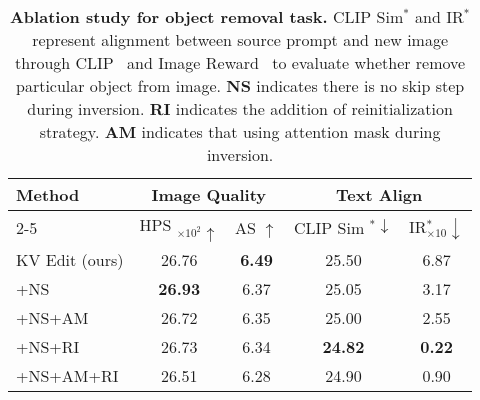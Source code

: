 \begin{table}[h]
\begin{center} 
\setlength{\tabcolsep}{0.75mm} %
\begin{tabular}{l|cc|cc}
\toprule
\multirow{3}{*}[0.8ex]{Method} & \multicolumn{2}{c|}{Image Quality} & \multicolumn{2}{c}{Text Align} \\
\cmidrule(lr){2-5} & HPS $_{\times 10^2}\uparrow$ & AS $\uparrow$ & CLIP Sim $^*\downarrow$ & IR$^*_{\times10}\downarrow$\\
\midrule
KV Edit (ours) & 26.76& \textbf{6.49} & 25.50& 6.87\\
+NS & \textbf{26.93}& 6.37& 25.05& 3.17\\
+NS+AM & 26.72& 6.35& 25.00& 2.55\\
+NS+RI & 26.73& 6.34& \textbf{24.82}& \textbf{0.22}\\
+NS+AM+RI & 26.51& 6.28& 24.90& 0.90\\
\bottomrule
\end{tabular}
\caption{\textbf{Ablation study for object removal task.} CLIP Sim$^*$ and IR$^*$ represent alignment between source prompt and new image through CLIP~\cite{radford2021learning} and Image Reward~\cite{xu2023imagereward} to evaluate whether remove particular object from image. \textbf{NS} indicates there is no skip step during inversion. \textbf{RI} indicates the addition of reinitialization strategy. \textbf{AM} indicates that using attention mask during inversion.} 
\label{tab:ablation} 
\end{center}
\vspace{-20pt}
\end{table}
